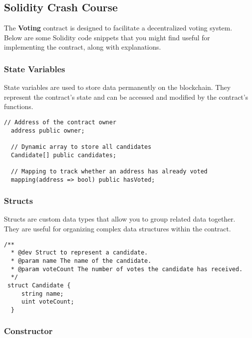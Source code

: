 \documentclass[12pt]{article}
\begin{document}
\subsection{Solidity Crash Course}

The \textbf{Voting} contract is designed to facilitate a decentralized voting system. Below are some Solidity code snippets that you might find useful for implementing the contract, along with explanations.

\subsubsection*{State Variables}

State variables are used to store data permanently on the blockchain. They represent the contract's state and can be accessed and modified by the contract's functions.

\noindent
\begin{minipage}[c]{\textwidth}
\begin{lstlisting}[language=Solidity]
  // Address of the contract owner
  address public owner;

  // Dynamic array to store all candidates
  Candidate[] public candidates;

  // Mapping to track whether an address has already voted
  mapping(address => bool) public hasVoted;
\end{lstlisting}
\end{minipage}

\subsubsection*{Structs}

Structs are custom data types that allow you to group related data together. They are useful for organizing complex data structures within the contract.

\noindent
\begin{minipage}[c]{\textwidth}
\begin{lstlisting}[language=Solidity]
  /**
  * @dev Struct to represent a candidate.
  * @param name The name of the candidate.
  * @param voteCount The number of votes the candidate has received.
  */
 struct Candidate {
     string name;
     uint voteCount;
  }
\end{lstlisting}
\end{minipage}

\subsubsection*{Constructor}
\end{document}
